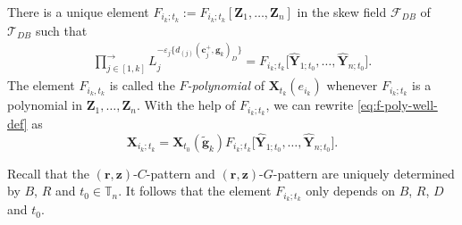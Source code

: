 \begin{Definition}
 There is a unique element $F_{i_k;t_k}:=F_{i_k;t_k}[\mathbf{Z}_1,\dots, \mathbf{Z}_n]$ in the skew field $\mathcal{F}_{DB}$ of~$\mathcal{T}_{DB}$ such that
 \begin{align}\label{eq:gupta-formula}
 \prod\limits^{\longrightarrow}_{j\in[1,k]}L_{j}^{-\varepsilon_{j}\{d_{(j)}(\mathbf{c}_{j}^{+},\mathbf{g}_{k})_D\}}=F_{i_k;t_k}\big[\hat{\mathbf{Y}}_{1;t_0},\dots, \hat{\mathbf{Y}}_{n;t_0}\big].
 \end{align}
 The element $F_{i_k,t_k}$ is called the {\it $F$-polynomial} of $\mathbf{X}_{t_k}(e_{i_k})$ whenever $F_{i_k;t_k}$ is a polynomial in $\mathbf{Z}_1,\dots,\mathbf{Z}_n$. With the help of $F_{i_k;t_k}$, we can rewrite \eqref{eq:f-poly-well-def} as
 \[
 \mathbf{X}_{i_k;t_k}=\mathbf{X}_{t_0}(\tilde{\mathbf{g}}_k)F_{i_k;t_k}\big[\hat{\mathbf{Y}}_{1;t_0},\dots, \hat{\mathbf{Y}}_{n;t_0}\big].
 \]

\end{Definition}
\begin{Remark}
 Recall that the $(\mathbf{r},\mathbf{z})$-$C$-pattern and $(\mathbf{r},\mathbf{z})$-$G$-pattern are uniquely determined by $B$, $R$ and $t_0\in \mathbb{T}_n$. It follows that the element $F_{i_k;t_k}$ only depends on $B$, $R$, $D$ and $t_0$.
\end{Remark}

